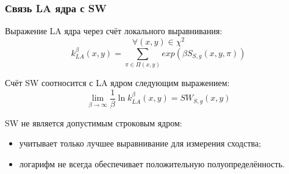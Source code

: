\documentclass{beamer}
\begin{document}
\begin{frame}
\frametitle{Связь LA ядра с SW}
Выражение LA ядра через счёт локального выравнивания:
\begin{equation*}
    \forall (x, y) \in \chi^2
\end{equation*}
\begin{equation*}
    k_{LA}^{\beta}(x, y) = \sum_{\pi \in \Pi(x, y)}exp(\beta S_{S, g}(x, y, \pi))
\end{equation*}
\bigskip

Счёт SW соотносится с LA ядром следующим выражением:
\begin{equation*}
    \lim_{\beta\to\infty} \frac{1}{\beta} \ln k_{LA}^{\beta}(x, y)
    = SW_{S,g}(x, y)
\end{equation*}

SW не является допустимым строковым ядром:
\begin{itemize}
    \item учитывает только лучшее выравнивание для измерения сходства;
    \item логарифм не всегда обеспечивает положительную полуопределённость.
\end{itemize}
\end{frame}


%




\end{document}
